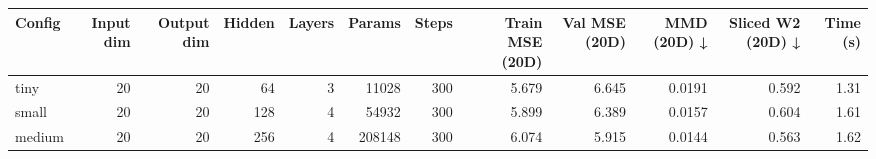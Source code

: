 \begin{tabular}{lrrrrrrrrrrr}
\toprule
Config & Input dim & Output dim & Hidden & Layers & Params & Steps & Train MSE (20D) & Val MSE (20D) & MMD (20D) ↓ & Sliced W2 (20D) ↓ & Time (s) \\
\midrule
tiny & 20 & 20 & 64 & 3 & 11028 & 300 & 5.679 & 6.645 & 0.0191 & 0.592 & 1.31 \\
small & 20 & 20 & 128 & 4 & 54932 & 300 & 5.899 & 6.389 & 0.0157 & 0.604 & 1.61 \\
medium & 20 & 20 & 256 & 4 & 208148 & 300 & 6.074 & 5.915 & 0.0144 & 0.563 & 1.62 \\
\bottomrule
\end{tabular}
